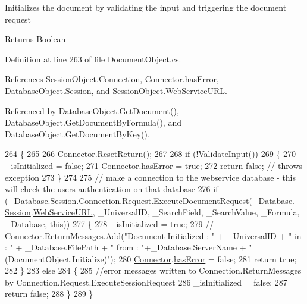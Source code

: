 Initializes the document by validating the input and triggering the document request 

\begin{DoxyReturn}{Returns}
Boolean
\end{DoxyReturn}


Definition at line 263 of file Document\+Object.\+cs.



References Session\+Object.\+Connection, Connector.\+has\+Error, Database\+Object.\+Session, and Session\+Object.\+Web\+Service\+U\+RL.



Referenced by Database\+Object.\+Get\+Document(), Database\+Object.\+Get\+Document\+By\+Formula(), and Database\+Object.\+Get\+Document\+By\+Key().


\begin{DoxyCode}
264     \{
265 
266         \mbox{\hyperlink{class_connector}{Connector}}.ResetReturn();
267 
268         \textcolor{keywordflow}{if} (!ValidateInput())
269         \{
270             \_isInitialized = \textcolor{keyword}{false};
271             \mbox{\hyperlink{class_connector}{Connector}}.\mbox{\hyperlink{class_connector_a079bae21a5417efa53bfe8954c0f533f}{hasError}} = \textcolor{keyword}{true};
272             \textcolor{keywordflow}{return} \textcolor{keyword}{false};   \textcolor{comment}{// throws exception}
273         \}
274 
275         \textcolor{comment}{// make a connection to the webservice database - this will check the users authentication on that
       database}
276         \textcolor{keywordflow}{if} (\_Database.\mbox{\hyperlink{class_database_object_aa8484162b7d2a7c4c9426bca13c64c07}{Session}}.\mbox{\hyperlink{class_session_object_a014bdbf705a753540e19bfb53030c55c}{Connection}}.Request.ExecuteDocumentRequest(\_Database.
      \mbox{\hyperlink{class_database_object_aa8484162b7d2a7c4c9426bca13c64c07}{Session}}.\mbox{\hyperlink{class_session_object_a697c071c812fbf7ad1166b896fb44c16}{WebServiceURL}}, \_UniversalID, \_SearchField, \_SearchValue, \_Formula, \_Database, \textcolor{keyword}{
      this}))
277         \{
278             \_isInitialized = \textcolor{keyword}{true};
279             \textcolor{comment}{//  Connector.ReturnMessages.Add("Document Initialized : " + \_UniversalID + " in : " +
       \_Database.FilePath + " from : "+\_Database.ServerName + " (DocumentObject.Initialize)");}
280             \mbox{\hyperlink{class_connector}{Connector}}.\mbox{\hyperlink{class_connector_a079bae21a5417efa53bfe8954c0f533f}{hasError}} = \textcolor{keyword}{false};
281             \textcolor{keywordflow}{return} \textcolor{keyword}{true};
282         \}
283         \textcolor{keywordflow}{else}
284         \{
285             \textcolor{comment}{//error messages written to Connection.ReturnMessages by
       Connection.Request.ExecuteSessionRequest}
286             \_isInitialized = \textcolor{keyword}{false};
287             \textcolor{keywordflow}{return} \textcolor{keyword}{false};
288         \}
289     \}
\end{DoxyCode}
